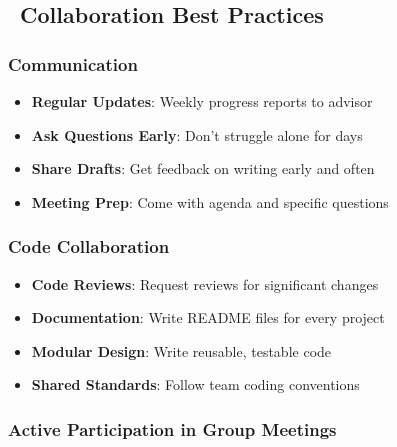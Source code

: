 \documentclass[11pt,a4paper]{article}
\begin{document}
\subsection{\faUsers~Collaboration Best Practices}

\subsubsection{Communication}
\begin{itemize}
    \item \textbf{Regular Updates}: Weekly progress reports to advisor
    \item \textbf{Ask Questions Early}: Don't struggle alone for days
    \item \textbf{Share Drafts}: Get feedback on writing early and often
    \item \textbf{Meeting Prep}: Come with agenda and specific questions
\end{itemize}

\subsubsection{Code Collaboration}
\begin{itemize}
    \item \textbf{Code Reviews}: Request reviews for significant changes
    \item \textbf{Documentation}: Write README files for every project
    \item \textbf{Modular Design}: Write reusable, testable code
    \item \textbf{Shared Standards}: Follow team coding conventions
\end{itemize}

\subsubsection{Active Participation in Group Meetings}
\end{document}
